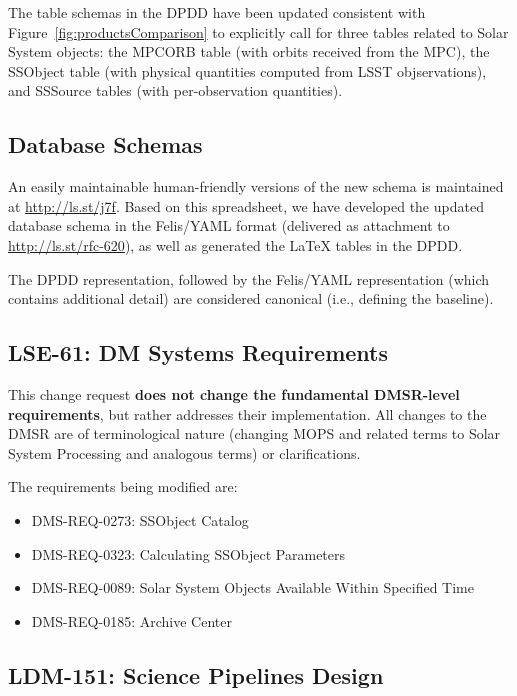 \documentclass[DM,authoryear,toc]{lsstdoc}
\begin{document}
The table schemas in the DPDD have been updated consistent with Figure~\ref{fig:productsComparison} to explicitly call for three tables related to Solar System objects: the MPCORB table (with orbits received from the MPC), the SSObject table (with physical quantities computed from LSST objservations), and SSSource tables (with per-observation quantities).

\subsection{Database Schemas}

An easily maintainable human-friendly versions of the new schema is maintained at \url{http://ls.st/j7f}. Based on this spreadsheet, we have developed the updated database schema in the Felis/YAML format (delivered as attachment to \url{http://ls.st/rfc-620}), as well as generated the \LaTeX{} tables in the DPDD.

The DPDD representation, followed by the Felis/YAML representation (which contains additional detail) are considered canonical (i.e., defining the baseline).

\subsection{LSE-61: DM Systems Requirements}

This change request {\bf does not change the fundamental DMSR-level requirements}, but rather addresses their implementation. All changes to the DMSR are of terminological nature (changing MOPS and related terms to Solar System Processing and analogous terms) or clarifications.

The requirements being modified are:
\begin{itemize}
	\item DMS-REQ-0273: SSObject Catalog
	\item DMS-REQ-0323: Calculating SSObject Parameters
	\item DMS-REQ-0089: Solar System Objects Available Within Specified Time
	\item DMS-REQ-0185: Archive Center
\end{itemize}

\subsection{LDM-151: Science Pipelines Design}
\end{document}
